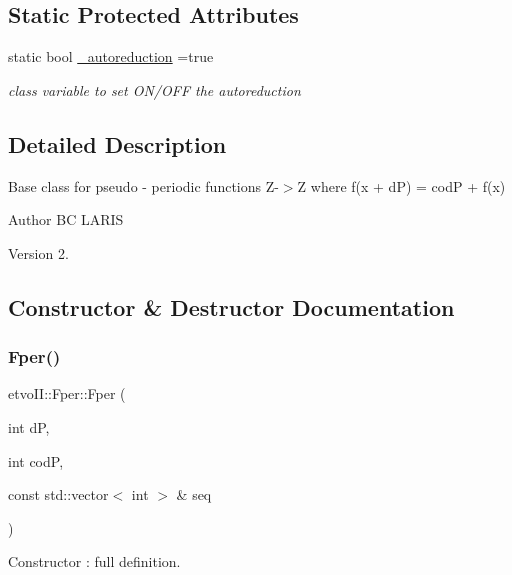 \subsection*{Static Protected Attributes}
\begin{DoxyCompactItemize}
\item 
static bool \mbox{\hyperlink{classetvo_i_i_1_1_fper_ada0cc8d2afca070616aed2a397e6ccc3}{\+\_\+autoreduction}} =true
\begin{DoxyCompactList}\small\item\em class variable to set O\+N/\+O\+FF the autoreduction \end{DoxyCompactList}\end{DoxyCompactItemize}


\subsection{Detailed Description}
Base class for pseudo -\/ periodic functions Z-\/$>$Z where f(x + dP) = codP + f(x) 

\begin{DoxyAuthor}{Author}
BC L\+A\+R\+IS 
\end{DoxyAuthor}
\begin{DoxyVersion}{Version}
2. 
\end{DoxyVersion}


\subsection{Constructor \& Destructor Documentation}
\mbox{\label{classetvo_i_i_1_1_fper_ae12f6a9faf9cd619437b92e9aee41874}} 
\subsubsection{\texorpdfstring{Fper()}{Fper()}}
{\footnotesize\ttfamily etvo\+I\+I\+::\+Fper\+::\+Fper (\begin{DoxyParamCaption}\item[{int}]{dP,  }\item[{int}]{codP,  }\item[{const std\+::vector$<$ int $>$ \&}]{seq }\end{DoxyParamCaption})}



Constructor \+: full definition. 


